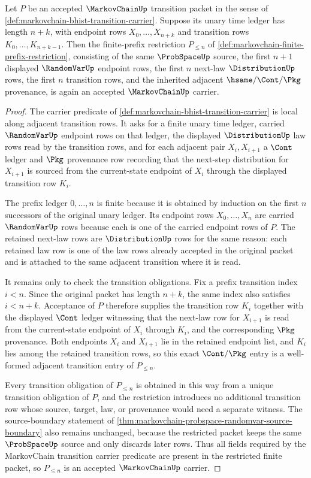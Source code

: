 \begin{theorem}
\label{thm:markovchain-finite-prefix-restriction-carrier}
Let $P$ be an accepted $\MarkovChainUp$ transition packet in the sense of \autoref{def:markovchain-bhist-transition-carrier}. Suppose its unary time ledger has length $n+k$, with endpoint rows $X_0,\ldots,X_{n+k}$ and transition rows $K_0,\ldots,K_{n+k-1}$. Then the finite-prefix restriction $P_{\le n}$ of \autoref{def:markovchain-finite-prefix-restriction}, consisting of the same $\ProbSpaceUp$ source, the first $n+1$ displayed $\RandomVarUp$ endpoint rows, the first $n$ next-law $\DistributionUp$ rows, the first $n$ transition rows, and the inherited adjacent $\hsame/\Cont/\Pkg$ provenance, is again an accepted $\MarkovChainUp$ carrier.
\end{theorem}
\begin{proof}
The carrier predicate of \autoref{def:markovchain-bhist-transition-carrier} is local along adjacent transition rows. It asks for a finite unary time ledger, carried $\RandomVarUp$ endpoint rows on that ledger, the displayed $\DistributionUp$ law rows read by the transition rows, and for each adjacent pair $X_i,X_{i+1}$ a $\Cont$ ledger and $\Pkg$ provenance row recording that the next-step distribution for $X_{i+1}$ is sourced from the current-state endpoint of $X_i$ through the displayed transition row $K_i$.

The prefix ledger $0,\ldots,n$ is finite because it is obtained by induction on the first $n$ successors of the original unary ledger. Its endpoint rows $X_0,\ldots,X_n$ are carried $\RandomVarUp$ rows because each is one of the carried endpoint rows of $P$. The retained next-law rows are $\DistributionUp$ rows for the same reason: each retained law row is one of the law rows already accepted in the original packet and is attached to the same adjacent transition where it is read.

It remains only to check the transition obligations. Fix a prefix transition index $i<n$. Since the original packet has length $n+k$, the same index also satisfies $i<n+k$. Acceptance of $P$ therefore supplies the transition row $K_i$ together with the displayed $\Cont$ ledger witnessing that the next-law row for $X_{i+1}$ is read from the current-state endpoint of $X_i$ through $K_i$, and the corresponding $\Pkg$ provenance. Both endpoints $X_i$ and $X_{i+1}$ lie in the retained endpoint list, and $K_i$ lies among the retained transition rows, so this exact $\Cont/\Pkg$ entry is a well-formed adjacent transition entry of $P_{\le n}$.

Every transition obligation of $P_{\le n}$ is obtained in this way from a unique transition obligation of $P$, and the restriction introduces no additional transition row whose source, target, law, or provenance would need a separate witness. The source-boundary statement of \autoref{thm:markovchain-probspace-randomvar-source-boundary} also remains unchanged, because the restricted packet keeps the same $\ProbSpaceUp$ source and only discards later rows. Thus all fields required by the MarkovChain transition carrier predicate are present in the restricted finite packet, so $P_{\le n}$ is an accepted $\MarkovChainUp$ carrier.
\end{proof}

